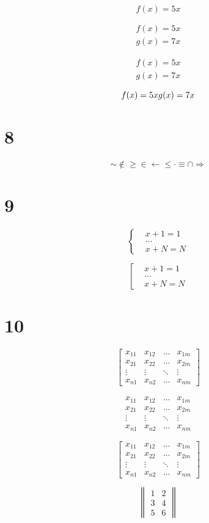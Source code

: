 \documentclass[a4paper,12pt]{article}
\begin{document}
\begin{equation}
f(x)=5x
\end{equation}

\begin{equation}
\begin{aligned}
f(x)=5x\\
g(x)=7x
\end{aligned}
\end{equation}

\begin{align}
f(x)=5x\\
g(x)=7x
\end{align} 

\begin{equation}
f(x)=5x\\
g(x)=7x
\end{equation}  

\section{8}
\[ \sim \notin \geqslant \in \leftarrow \le \cdot \equiv \cap \Rightarrow \]

\section{9}
\[\left\{
\begin{aligned}
& x+1=1\\
& \ldots\\
& x + N = N
\end{aligned}
\right.\] 

\[\left[ 
\begin{aligned} 
& x+1=1\\ 
& \ldots\\ 
& x+ N = N 
\end{aligned} 
\right.\] 


\section{10}
\[ 
\left[ 
\begin{array}{cccc} 
x_{11} & x_{12} & \ldots & x_{1m}\\ 
x_{21} & x_{22} & \ldots & x_{2m}\\ 
\vdots & \vdots & \ddots & \vdots\\ 
x_{n1} & x_{n2} & \ldots & x_{nm} 
\end{array} 
\right] 
\] 

\[ 
\begin{matrix} 
x_{11} & x_{12} & \ldots & x_{1m}\\ 
x_{21} & x_{22} & \ldots & x_{2m}\\ 
\vdots & \vdots & \ddots & \vdots\\ 
x_{n1} & x_{n2} & \ldots & x_{nm} 
\end{matrix} 
\] 

\[ 
\begin{bmatrix} 
x_{11} & x_{12} & \ldots & x_{1m}\\ 
x_{21} & x_{22} & \ldots & x_{2m}\\ 
\vdots & \vdots & \ddots & \vdots\\ 
x_{n1} & x_{n2} & \ldots & x_{nm} 
\end{bmatrix} 
\] 

\[ 
\begin{Vmatrix} 
1 & 2\\ 
3 & 4\\ 
5 & 6 
\end{Vmatrix} 
\] 
\end{document}
